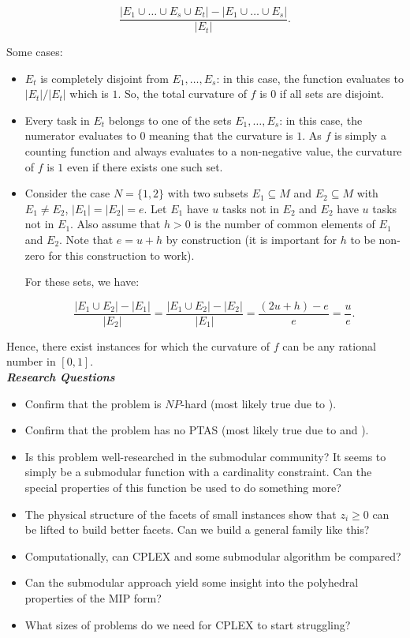 \documentclass[12pt]{article}
\newcommand{\labs}{\left|}
\newcommand{\rabs}{\right|}
\newcommand{\subheading}[1]{\emph{\textbf{#1}}}
\begin{document}
\[\frac{\labs E_1 \cup \ldots \cup E_s \cup E_t \rabs - \labs E_1 \cup \ldots \cup E_s\rabs}{\labs E_t \rabs}.\]

Some cases:
\begin{itemize}
\item $E_t$ is completely disjoint from $E_1,\ldots,E_s$: in this case, the function evaluates to $|E_t|/|E_t|$ which is $1$. So, the total curvature of $f$ is $0$ if all sets are disjoint.

\item Every task in $E_t$ belongs to one of the sets $E_1,\ldots,E_s$: in this case, the numerator evaluates to $0$ meaning that the curvature is $1$. As $f$ is simply a counting function and always evaluates to a non-negative value, the curvature of $f$ is $1$ even if there exists one such set.

\item Consider the case $N = \{1,2\}$ with two subsets $E_1 \subseteq M$ and $E_2 \subseteq M$ with $E_1 \neq E_2$, $|E_1| = |E_2| = e$. Let $E_1$ have $u$ tasks not in $E_2$ and $E_2$ have $u$ tasks not in $E_1$. Also assume that $h > 0$ is the number of common elements of $E_1$ and $E_2$. Note that $e=u+h$ by construction (it is important for $h$ to be non-zero for this construction to work).

For these sets, we have:

\[
\frac{|E_1 \cup E_2| - |E_1|}{|E_2|} = \frac{|E_1 \cup E_2| - |E_2|}{|E_1|} = \frac{(2u + h) - e}{e} = \frac{u}{e}.
\]
\end{itemize}

Hence, there exist instances for which the curvature of $f$ can be any rational number in $[0,1]$.\\

\subheading{Research Questions}
\begin{itemize}
\item Confirm that the problem is $NP$-hard (most likely true due to \cite{Vinterbo2007}).
\item Confirm that the problem has no PTAS (most likely true due to \cite{Vinterbo2007} and \cite{SubhashKhot2006}).
\item Is this problem well-researched in the submodular community? It seems to simply be a submodular function with a cardinality constraint. Can the special properties of this function be used to do something more?
\item The physical structure of the facets of small instances show that $z_i \geq 0$ can be lifted to build better facets. Can we build a general family like this?
\item Computationally, can CPLEX and some submodular algorithm be compared?
\item Can the submodular approach yield some insight into the polyhedral properties of the MIP form?
\item What sizes of problems do we need for CPLEX to start struggling?
\end{itemize}
\end{document}
